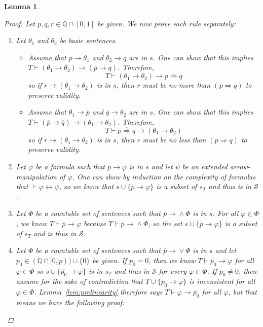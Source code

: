 \documentclass{amsart}
\newtheorem{lemma}[theorem]{Lemma}
\theoremstyle{definition}
\numberwithin{equation}{theorem}
\renewcommand{\phi}{\varphi}
\newcommand{\Q}{\mathbb{Q}}
\newcommand{\unvee}{{\vee}}
\newcommand{\unwedge}{{\wedge}}
\newcommand{\proves}{\vdash}
\newcommand{\rat}[1]{{\overline{#1}}}
\newcommand{\narrow}[1]{\xrightarrow{#1}}
\renewcommand{\to}{\narrow{}}
\begin{document}
\begin{lemma}
\begin{proof}
    Let $p,q,r\in\Q\cap[0,1]$ be given.
    We now prove each rule separately:
    \begin{enumerate}[label=(CP\arabic*)]
    \item
      Let $\theta_1$ and $\theta_2$ be basic sentences.
      \begin{itemize}
      \item
        Assume that $\rat p\to\theta_1$ and $\theta_2\to\rat q$ are in $s$.
        One can show that this implies $T\proves(\theta_1\to\theta_2)\to(\rat p\to\rat q)$.
        Therefore,
        \[
          T\proves(\theta_1\to\theta_2)\to\rat{p\Rightarrow q}
        \]
        so if $\rat r\to(\theta_1\to\theta_2)$ is in $s$, then $r$ must be no more than $(p\Rightarrow q)$ to preserve validity.
      \item 
        Assume that $\theta_1\to\rat p$ and $\rat q\to\theta_2$ are in $s$.
        One can show that this implies $T\proves(\rat p\to\rat q)\to(\theta_1\to\theta_2)$.
        Therefore,
        \[
          T\proves\rat{p\Rightarrow q}\to(\theta_1\to\theta_2)
        \]
        so if $\rat r\to(\theta_1\to\theta_2)$ is in $s$, then $r$ must be no less than $(p\Rightarrow q)$ to preserve validity.
      \end{itemize}
	  \item
	    Let $\phi$ be a formula such that $\rat p\to\phi$ is in $s$ and let $\psi$ be an extended arrow-manipulation of $\phi$.
      One can show by induction on the complexity of formulas that $\proves\phi\leftrightarrow\psi$, so we know that $s\cup\{\rat p\to\phi\}$ is a subset of $s_T$ and thus is in $\mathscr{S}$.
    \item 
	    Let $\Phi$ be a countable set of sentences such that $\rat p\to\unwedge\Phi$ is in $s$.
	    For all $\phi\in\Phi$, we know $T\proves\rat p\to\phi$ because $T\proves\rat p\to\unwedge\Phi$, so the set $s\cup\{\rat p\to\phi\}$ is a subset of $s_T$ and is thus in $\mathscr{S}$.
	  \item
	    Let $\Phi$ be a countable set of sentences such that $\rat p\to\unvee\Phi$ is in $s$ and let $p_0\in(\Q\cap[0,p))\cup\{0\}$ be given.
	    If $p_0=0$, then we know $T\proves\rat{p_0}\to\phi$ for all $\phi\in\Phi$ so $s\cup\{\rat{p_0}\to\phi\}$ is in $s_T$ and thus in $\mathscr{S}$ for every $\phi\in\Phi$.
	    If $p_0\neq 0$, then assume for the sake of contradiction that $T\cup\{\rat{p_0}\to\phi\}$ is inconsistent for all $\phi\in\Phi$.
	    Lemma~\ref{lem:prelinearity} therefore says $T\proves\phi\to\rat{p_0}$ for all $\phi$, but that means we have the following proof:

\end{enumerate}
\end{proof}
\end{lemma}
\end{document}
